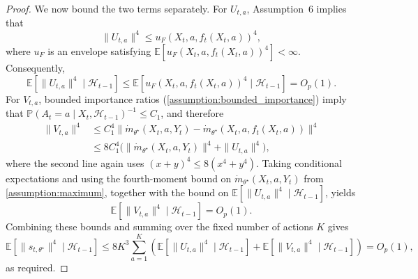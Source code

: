 \documentclass[11pt]{article}
\newcommand{\E}{\mathbb{E}}
\begin{document}
\begin{appendix}
\begin{proof}
We now bound the two terms separately. For $U_{t,a}$, Assumption~6 implies that
\[
\|U_{t,a}\|^{4}
\le u_F(X_t,a,f_t(X_t,a))^{4},
\]
where $u_F$ is an envelope satisfying $\E[u_F(X_t,a,f_t(X_t,a))^{4}]<\infty$. Consequently,
\[
\E\!\left[\|U_{t,a}\|^{4}\mid \mathcal H_{t-1}\right]
\le
\E\!\left[u_F(X_t,a,f_t(X_t,a))^{4}\mid \mathcal H_{t-1}\right]
=O_p(1).
\]
For $V_{t,a}$, bounded importance ratios (\cref{assumption:bounded_importance}) imply that
$\mathbb P(A_t=a\mid X_t,\mathcal H_{t-1})^{-1}\le C_1$, and therefore
\begin{align*}
\|V_{t,a}\|^{4}
&\le C_1^{4}
\big\|\dot m_{\theta^\star}(X_t,a,Y_t)
-\dot m_{\theta^\star}(X_t,a,f_t(X_t,a))\big\|^{4} \\
&\le 8C_1^{4}
\Big(
\|\dot m_{\theta^\star}(X_t,a,Y_t)\|^{4}
+\|U_{t,a}\|^{4}
\Big),
\end{align*}
where the second line again uses $(x+y)^4\le 8(x^4+y^4)$. Taking conditional expectations and
using the fourth-moment bound on $\dot m_{\theta^\star}(X_t,a,Y_t)$ from \cref{assumption:maximum},
together with the bound on $\E[\|U_{t,a}\|^{4}\mid\mathcal H_{t-1}]$, yields
\[
\E\!\left[\|V_{t,a}\|^{4}\mid \mathcal H_{t-1}\right]=O_p(1).
\]
Combining these bounds and summing over the fixed number of actions $K$ gives
\[
\E\!\left[\|s_{t,\theta^\star}\|^{4}\mid \mathcal H_{t-1}\right]
\le
8K^{3}\sum_{a=1}^{K}
\left(
\E[\|U_{t,a}\|^{4}\mid\mathcal H_{t-1}]
+
\E[\|V_{t,a}\|^{4}\mid\mathcal H_{t-1}]
\right)
=O_p(1),
\]
as required.



\end{proof}
\end{appendix}
\end{document}

